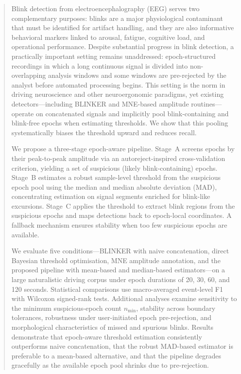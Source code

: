 \begin{abstract}
Blink detection from electroencephalography (EEG) serves two complementary purposes:
blinks are a major physiological contaminant that must be identified for artifact
handling, and they are also informative behavioral markers linked to arousal, fatigue,
cognitive load, and operational performance.
Despite substantial progress in blink detection, a practically important setting
remains unaddressed: epoch-structured recordings in which a long continuous signal is
divided into non-overlapping analysis windows and some windows are pre-rejected by the
analyst before automated processing begins.
This setting is the norm in driving neuroscience and other neuroergonomic paradigms,
yet existing detectors---including BLINKER and MNE-based amplitude routines---operate
on concatenated signals and implicitly pool blink-containing and blink-free epochs when
estimating thresholds.
We show that this pooling systematically biases the threshold upward and reduces recall.

We propose a three-stage epoch-aware pipeline.
Stage~A screens epochs by their peak-to-peak amplitude via an autoreject-inspired
cross-validation criterion, yielding a set of suspicious (likely blink-containing)
epochs.
Stage~B estimates a robust sample-level threshold from the suspicious epoch pool using
the median and median absolute deviation (MAD), concentrating estimation on
signal segments enriched for blink-like excursions.
Stage~C applies the threshold to extract blink regions from the suspicious epochs and
maps detections back to epoch-local coordinates.
A fallback mechanism ensures stability when too few suspicious epochs are available.

We evaluate five conditions---BLINKER with naive concatenation, direct Bayesian
threshold optimisation, MNE amplitude annotation, and the proposed pipeline with
mean-based and median-based estimators---on a large naturalistic driving corpus
under epoch durations of 20, 30, 60, and 120 seconds.
Statistical comparisons use macro-averaged event-level F1 with Wilcoxon signed-rank
tests.
Additional analyses examine sensitivity to the minimum suspicious-epoch count
$n_{\min}$, stability across boundary tolerances, robustness under user-initiated
epoch pre-rejection, and morphological characteristics of missed and spurious blinks.
Results demonstrate that epoch-aware threshold estimation consistently outperforms
naive concatenation, that the robust MAD-based estimator is preferable to a
mean-based alternative, and that the pipeline degrades gracefully as the available
epoch pool shrinks due to pre-rejection.
\end{abstract}
